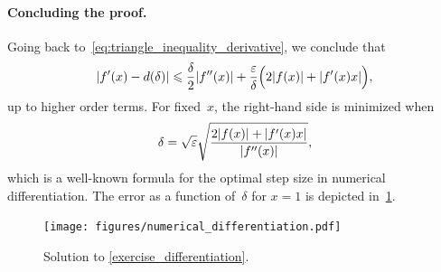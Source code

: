 \begin{solution}
    \paragraph{Concluding the proof.}
    Going back to~\eqref{eq:triangle_inequality_derivative},
    we conclude that
    \[
        \lvert f'(x) - d(\delta) \rvert \leq \frac{\delta}{2} \lvert f''(x) \rvert + \frac{\varepsilon}{\delta} \Bigl( 2 \lvert f(x) \rvert + \lvert f'(x) x \rvert \Bigr),
    \]
    up to higher order terms.
    For fixed~$x$,
    the right-hand side is minimized when
    \[
        \delta = \sqrt{\varepsilon} \sqrt{\frac{ 2 \lvert f(x) \rvert + \lvert f'(x) x \rvert }{\abs{f''(x)}}},
    \]
    which is a well-known formula for the optimal step size in numerical differentiation.
    The error as a function of~$\delta$ for $x = 1$ is depicted in~\cref{fig:differentiation}.
\end{solution}
\begin{figure}[ht]
    \centering
    \texttt{[image: figures/numerical\_differentiation.pdf]}
    \caption{Solution to \cref{exercise_differentiation}.}%
    \label{fig:differentiation}
\end{figure}


